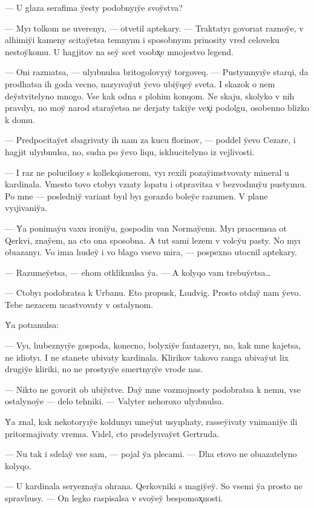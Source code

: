 \documentclass[10pt]{book}
\begin{document}
— U glaza serafima y̆esty podobnyıy̆e svoy̆stva?

— Myı tolkom ne uverenyı, — otvetil aptekary. — Traktatyı govorıat raznoy̆e, v alhimiy̆i kameny scitay̆etsa temnyım i sposobnyım prinosity vred celoveku nestoy̆komu. U hagjitov na sey̆ scet voobx̨e mnojestvo legend.

— Oni raznıatsa, — ulyıbnulsa britogolovyıy̆ torgoveq. — Pustyınnyıy̆e starqi, da prodlıatsa ih goda vecno, nazyıvay̆ut y̆evo ubiy̆qey̆ sveta. I skazok o nem dey̆stvitelyno mnogo. Vse kak odna s plohim konqom. Ne skaju, skolyko v nih pravdyı, no moy̆ narod staray̆etsa ne derjaty takiy̆e vex̨i podolgu, osobenno blizko k domu.

— Predpocitay̆et sbagrivaty ih nam za kucu florinov, — poddel y̆evo Cezare, i hagjit ulyıbnulsa, no, sudıa po y̆evo liqu, isklıucitelyno iz vejlivosti.

— I raz ne polucilosy s kollekqionerom, vyı rexili pozay̆imstvovaty mineral u kardinala. Vmesto tovo ctobyı vzıaty lopatu i otpravitsa v bezvodnuy̆u pustyınıu. Po mne — posledniy̆ variant byıl byı gorazdo boley̆e razumen. V plane vyıjivaniy̆a.

— Y̆a ponimay̆u vaxu ironiy̆u, gospodin van Normay̆enn. Myı prıacemsıa ot Qerkvi, znay̆em, na cto ona sposobna. A tut sami lezem v volcy̆u pasty. No myı obıazanyı. Vo imıa lıudey̆ i vo blago vsevo mira, — pospexno utocnil aptekary.

— Razumey̆etsa, — ehom otkliknulsa y̆a. — A kolyqo vam trebuy̆etsa…

— Ctobyı podobratsa k Urbanu. Eto propusk, Lıudvig. Prosto otday̆ nam y̆evo. Tebe nezacem ucastvovaty v ostalynom.

Y̆a potıanulsa:

— Vyı, lıubeznyıy̆e gospoda, konecno, bolyxiy̆e fantazeryı, no, kak mne kajetsa, ne idiotyı. I ne stanete ubivaty kardinala. Klirikov takovo ranga ubivay̆ut lix drugiy̆e kliriki, no ne prostyıy̆e smertnyıy̆e vrode nas.

— Nikto ne govorit ob ubiy̆stve. Day̆ mne vozmojnosty podobratsa k nemu, vse ostalynoy̆e — delo tehniki. — Valyter nehoroxo ulyıbnulsa.

Y̆a znal, kak nekotoryıy̆e koldunyı umey̆ut usyıplıaty, rassey̆ivaty vnimaniy̆e ili pritormajivaty vremıa. Videl, cto prodelyıvay̆et Gertruda.

— Nu tak i sdelay̆ vse sam, — pojal y̆a plecami. — Dlıa etovo ne obıazatelyno kolyqo.

— U kardinala seryeznay̆a ohrana. Qerkovniki s magiy̆ey̆. So vsemi y̆a prosto ne spravlıusy. — On legko raspisalsa v svoy̆ey̆ bespomox̨nosti.
\end{document}
